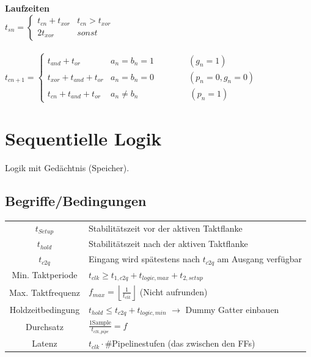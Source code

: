 \documentclass[6pt,a4paper]{scrartcl}
\newcommand{\ra}[0]{\ensuremath{\rightarrow}} 									%
\begin{document}
\begin{multicols*}{3}
\\ \\
\textbf{Laufzeiten} \\
$t_{sn} = \begin{cases} t_{cn} + t_{xor} & t_{cn} > t_{xor} \\ 2 t_{xor} & sonst \end{cases}$\\ \\
$t_{cn+1} = 
\begin{cases}
	t_{and} + t_{or}           & a_n = b_n = 1 \qquad \qquad (g_n=1)   \\
	t_{xor} + t_{and} + t_{or} & a_n = b_n = 0 \qquad \qquad  (p_n = 0, g_n = 0) \\
	t_{cn} + t_{and} + t_{or}  & a_n \ne b_n \qquad \qquad \qquad  (p_n = 1)
\end{cases}$\\

\section{Sequentielle Logik}
Logik mit Gedächtnis (Speicher).
	\subsection{Begriffe/Bedingungen}
	\begin{tabular}{c|l}
	$t_{Setup}$ & Stabilitätszeit vor der aktiven Taktflanke\\
	$t_{hold}$ & Stabilitätszeit nach  der aktiven Taktflanke\\
	$t_{c2q}$ & Eingang wird spätestens nach $t_{c2q}$ am Ausgang verfügbar\\
	 Min. Taktperiode &  $t_{clk} \ge t_{1,c2q} + t_{logic,max} + t_{2,setup}$  \\
	 Max. Taktfrequenz & $f_{max} = \left\lfloor \frac{1}{t_{clk}} \right\rfloor$ \qquad (Nicht aufrunden) \\
	 Holdzeitbedingung & $t_{hold} \le t_{c2q} + t_{logic,min}$  $\ra$ Dummy Gatter einbauen\\
	 Durchsatz & $\frac{1 \text{Sample}}{t_{clk,pipe}} = f$ \\
	 Latenz & $t_{clk} \cdot \#$Pipelinestufen (das zwischen den FFs) \\
	\end{tabular}
	
	

\end{multicols*}
\end{document}
